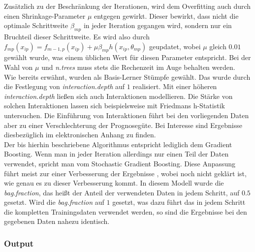 Zusätzlich zu der Beschränkung der Iterationen, wird dem Overfitting auch durch einen Shrinkage-Parameter $\mu$ entgegen gewirkt. Dieser bewirkt, dass nicht die optimale Schrittweite $\beta_{mp}$ in jeder Iteration gegangen wird, sondern nur ein Bruchteil dieser Schrittweite. Es wird also durch $f_{mp}(x_{ip}) = f_{m-1,p}(x_{ip}) + \mu \beta_{mp} h(x_{ip},\theta_{mp})$ geupdatet, wobei $\mu$ gleich $0.01$ gewählt wurde, was einem üblichen Wert für diesen Parameter entspricht. Bei der Wahl von $\mu$ und \textit{n.trees} muss stets die Rechenzeit im Auge behalten werden.\\
Wie bereits erwähnt, wurden als Basis-Lerner Stümpfe gewählt. Das wurde durch die Festlegung von \textit{interaction.depth} auf $1$ realisiert. Mit einer höheren \textit{interaction.depth} ließen sich auch Interaktionen modellieren. Die Stärke von solchen Interaktionen lassen sich beispielsweise mit Friedmans h-Statistik \cite{friedman_h} untersuchen. Die Einführung von Interaktionen führt bei den vorliegenden Daten aber zu einer Verschlechterung der Prognosegüte. Bei Interesse sind Ergebnisse diesbezüglich im elektronischen Anhang zu finden.\\
Der bis hierhin beschriebene Algorithmus entspricht lediglich dem Gradient Boosting. Wenn man in jeder Iteration allerdings nur einen Teil der Daten verwendet, spricht man vom Stochastic Gradient Boosting. Diese Anpassung führt meist zur einer Verbesserung der Ergebnisse \cite{fried_additive}, wobei noch nicht geklärt ist, wie genau es zu dieser Verbesserung kommt. In diesem Modell wurde die \textit{bag.fraction}, das heißt der Anteil der verwendeten Daten in jedem Schritt, auf $0.5$ gesetzt. Wird die \textit{bag.fraction} auf $1$ gesetzt, was dazu führt das in jedem Schritt die kompletten Trainingsdaten verwendet werden, so sind die Ergebnisse bei den gegebenen Daten nahezu identisch.

\subsubsection*{Output}

